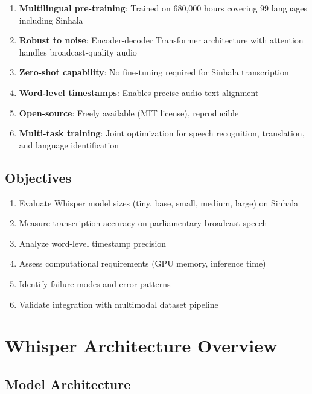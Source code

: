 \documentclass[11pt,a4paper]{article}
\begin{document}
\begin{enumerate}
    \item \textbf{Multilingual pre-training}: Trained on 680,000 hours covering 99 languages including Sinhala
    
    \item \textbf{Robust to noise}: Encoder-decoder Transformer architecture with attention handles broadcast-quality audio
    
    \item \textbf{Zero-shot capability}: No fine-tuning required for Sinhala transcription
    
    \item \textbf{Word-level timestamps}: Enables precise audio-text alignment
    
    \item \textbf{Open-source}: Freely available (MIT license), reproducible
    
    \item \textbf{Multi-task training}: Joint optimization for speech recognition, translation, and language identification
\end{enumerate}

\subsection{Objectives}

\begin{enumerate}
    \item Evaluate Whisper model sizes (tiny, base, small, medium, large) on Sinhala
    \item Measure transcription accuracy on parliamentary broadcast speech
    \item Analyze word-level timestamp precision
    \item Assess computational requirements (GPU memory, inference time)
    \item Identify failure modes and error patterns
    \item Validate integration with multimodal dataset pipeline
\end{enumerate}

\section{Whisper Architecture Overview}

\subsection{Model Architecture}
\end{document}
